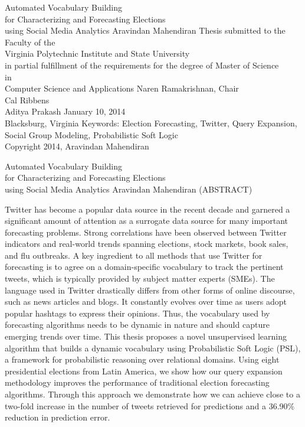 \documentclass[11pt]{report}
\begin{document}
\thispagestyle{empty}

\begin{center}
{\Large 
Automated Vocabulary Building\\
for Characterizing and Forecasting Elections\\
using Social Media Analytics
}
\vfill
Aravindan Mahendiran
\vfill
Thesis submitted to the Faculty of the \\
Virginia Polytechnic Institute and State University \\
in partial fulfillment of the requirements for the degree of
\vfill
Master of Science \\
in \\
Computer Science and Applications
\vfill
Naren Ramakrishnan, Chair \\
Cal Ribbens \\
Aditya Prakash
\vfill
January 10, 2014 \\
Blacksburg, Virginia
\vfill
Keywords: Election Forecasting, Twitter, Query Expansion, Social Group Modeling, Probabilistic Soft Logic \\
Copyright 2014, Aravindan Mahendiran
\end{center}
\pagebreak
\thispagestyle{empty}

\begin{center}
{\large Automated Vocabulary Building\\
for Characterizing and Forecasting Elections\\
using Social Media Analytics}
\vfill
Aravindan Mahendiran
\vfill
(ABSTRACT)
\vfill
\end{center}
Twitter has become a popular data source in the recent decade and garnered a significant amount
of attention as a surrogate data source for many important forecasting problems.
Strong correlations have been observed between Twitter indicators
and real-world trends spanning elections,
stock markets, book sales, and flu outbreaks.
A key ingredient to all methods that use Twitter for forecasting is to agree on a domain-specific
vocabulary to track the pertinent tweets, which is typically provided by subject matter experts (SMEs).
The language used in Twitter drastically differs from other forms of online discourse,
such as news articles and blogs.
It constantly evolves over time as users adopt popular hashtags to express their opinions.
Thus, the vocabulary used by forecasting algorithms needs to be dynamic in nature and should capture emerging 
trends over time.
This thesis proposes a novel unsupervised learning algorithm that
builds a dynamic vocabulary using Probabilistic Soft Logic (PSL), a framework for probabilistic reasoning over 
relational domains. Using eight presidential elections from Latin America, we show how our query expansion methodology 
improves the performance of traditional election forecasting algorithms. 
Through this approach we demonstrate how we can achieve close to a two-fold increase in the number of tweets
retrieved for predictions and a 36.90\% reduction in prediction error. 
\pagebreak
\end{document}
